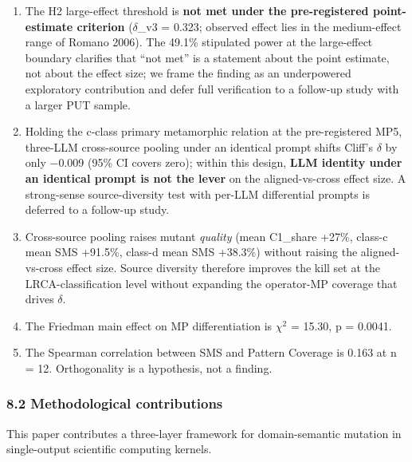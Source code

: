 \documentclass[review,12pt,authoryear]{elsarticle}
\begin{document}
\begin{enumerate}
\def\labelenumi{(\roman{enumi})}
\item
  The H2 large-effect threshold is \textbf{not met under the
  pre-registered point-estimate criterion} ($\delta$\_v3 = 0.323; observed
  effect lies in the medium-effect range of Romano 2006). The 49.1\%
  stipulated power at the large-effect boundary clarifies that ``not
  met'' is a statement about the point estimate, not about the effect
  size; we frame the finding as an underpowered exploratory contribution
  and defer full verification to a follow-up study with a larger PUT
  sample.
\item
  Holding the c-class primary metamorphic relation at the pre-registered
  MP5, three-LLM cross-source pooling under an identical prompt shifts
  Cliff's $\delta$ by only −0.009 (95\% CI covers zero); within this design,
  \textbf{LLM identity under an identical prompt is not the lever} on
  the aligned-vs-cross effect size. A strong-sense source-diversity test
  with per-LLM differential prompts is deferred to a follow-up study.
\item
  Cross-source pooling raises mutant \emph{quality} (mean C1\_share
  +27\%, class-c mean SMS +91.5\%, class-d mean SMS +38.3\%) without
  raising the aligned-vs-cross effect size. Source diversity therefore
  improves the kill set at the LRCA-classification level without
  expanding the operator-MP coverage that drives $\delta$.
\item
  The Friedman main effect on MP differentiation is $\chi$$^{2}$ = 15.30, p =
  0.0041.
\item
  The Spearman correlation between SMS and Pattern Coverage is 0.163 at
  n = 12. Orthogonality is a hypothesis, not a finding.
\end{enumerate}

\subsubsection{8.2 Methodological
contributions}\label{methodological-contributions}

This paper contributes a three-layer framework for domain-semantic
mutation in single-output scientific computing kernels.
\end{document}
